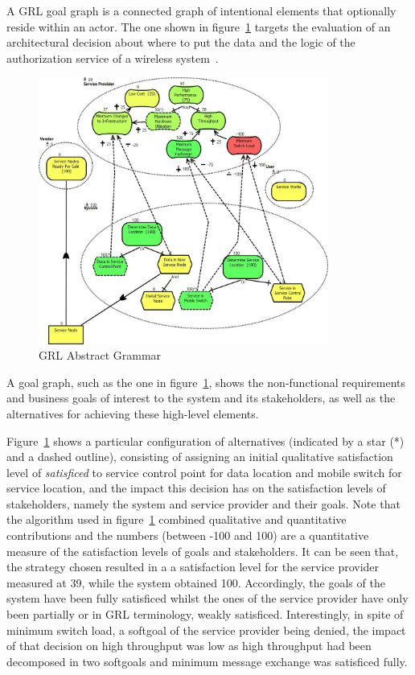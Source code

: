 \documentclass[dissertation,final]{softeng}
\begin{document}
A GRL goal graph is a connected graph of intentional elements that optionally reside within an actor. The one shown in figure~\ref{fig:WirelessIN_Integrated_GRLGraph} targets the evaluation of an architectural decision about where to put the data and the logic of the authorization service of a wireless system~\citep{amyot2011user}.

\begin{figure}[h]
\includegraphics[width=0.85\textwidth]{WirelessIN-Integrated-GRLGraph}
\centering
\caption[GRL Abstract Grammar]{GRL Abstract Grammar~\citep{amyot2011user}}
\label{fig:WirelessIN_Integrated_GRLGraph}
\end{figure}

A goal graph, such as the one in figure~\ref{fig:WirelessIN_Integrated_GRLGraph}, shows the non-functional requirements and business goals of interest to the system and its stakeholders, as well as the alternatives for achieving these high-level elements. 

Figure~\ref{fig:WirelessIN_Integrated_GRLGraph} shows a particular configuration of alternatives (indicated by a star (*) and a dashed outline), consisting of assigning an initial qualitative satisfaction level of \emph{satisficed} to service control point for data location and mobile switch for service location, and the impact this decision has on the satisfaction levels of stakeholders, namely the system and service provider and their goals. Note that the algorithm used in figure~\ref{fig:WirelessIN_Integrated_GRLGraph} combined qualitative and quantitative contributions and the numbers (between -100 and 100) are a quantitative measure of the satisfaction levels of goals and stakeholders. It can be seen that, the strategy chosen resulted in a a satisfaction level for the service provider measured at 39, while the system obtained 100. Accordingly, the goals of the system have been fully satisficed whilst the ones of the service provider have only been partially or in GRL terminology, weakly satisficed. Interestingly, in spite of minimum switch load, a softgoal of the service provider being denied, the impact of that decision on high throughput was low as high throughput had been decomposed in two softgoals and minimum message exchange was satisficed fully. 
\end{document}
